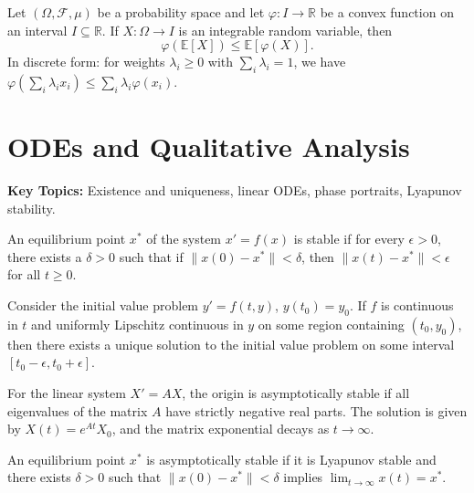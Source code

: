\begin{theorem}
Let $(\Omega, \mathcal{F}, \mu)$ be a probability space and let $\varphi: I \to \mathbb{R}$ be a convex function on an interval $I \subseteq \mathbb{R}$. If $X: \Omega \to I$ is an integrable random variable, then
\[
\varphi\left( \mathbb{E}[X] \right) \leq \mathbb{E}[\varphi(X)].
\]
In discrete form: for weights $\lambda_i \geq 0$ with $\sum_i \lambda_i = 1$, we have $\varphi\left(\sum_i \lambda_i x_i\right) \leq \sum_i \lambda_i \varphi(x_i)$.
\end{theorem}

\section{ODEs and Qualitative Analysis}

\textbf{Key Topics:} Existence and uniqueness, linear ODEs, phase portraits, Lyapunov stability.

\begin{definition}
An equilibrium point $x^*$ of the system $x' = f(x)$ is stable if for every $\epsilon > 0$, there exists a $\delta > 0$ such that if $\|x(0) - x^*\| < \delta$, then $\|x(t) - x^*\| < \epsilon$ for all $t \geq 0$.
\end{definition}

\begin{theorem}
Consider the initial value problem $y' = f(t, y)$, $y(t_0) = y_0$. If $f$ is continuous in $t$ and uniformly Lipschitz continuous in $y$ on some region containing $(t_0, y_0)$, then there exists a unique solution to the initial value problem on some interval $[t_0 - \epsilon, t_0 + \epsilon]$.
\end{theorem}

\begin{example}
For the linear system $X' = AX$, the origin is asymptotically stable if all eigenvalues of the matrix $A$ have strictly negative real parts. The solution is given by $X(t) = e^{At}X_0$, and the matrix exponential decays as $t \to \infty$.
\end{example}

\begin{definition}
An equilibrium point $x^*$ is asymptotically stable if it is Lyapunov stable and there exists $\delta > 0$ such that $\|x(0) - x^*\| < \delta$ implies $\lim_{t \to \infty} x(t) = x^*$.
\end{definition}

